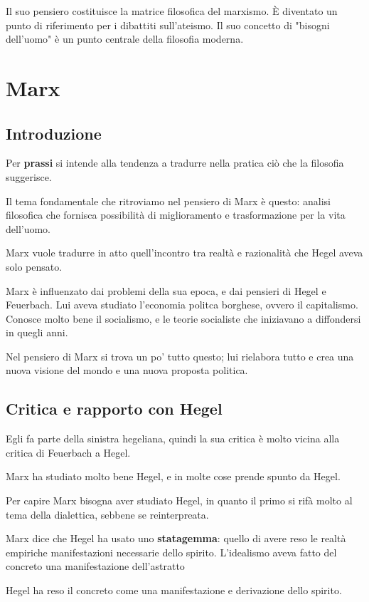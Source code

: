 \documentclass[a4paper, twoside, titlepage]{book}
\begin{document}
Il suo pensiero costituisce la matrice filosofica del marxismo. È diventato un punto di riferimento per i dibattiti sull'ateismo. Il suo concetto di "bisogni dell'uomo" è un punto centrale della filosofia moderna.


\part{Marx}

\chapter*{Introduzione}

Per \textbf{prassi} si intende alla tendenza a tradurre nella pratica ciò che la filosofia suggerisce.

Il tema fondamentale che ritroviamo nel pensiero di Marx è questo: analisi filosofica che fornisca possibilità di miglioramento e trasformazione per la vita dell'uomo.

Marx vuole tradurre in atto quell'incontro tra realtà e razionalità che Hegel aveva solo pensato.

Marx è influenzato dai problemi della sua epoca, e dai pensieri di Hegel e Feuerbach.
Lui aveva studiato l'economia politca borghese, ovvero il capitalismo.
Conosce molto bene il socialismo, e le teorie socialiste che iniziavano a diffondersi in quegli anni.

Nel pensiero di Marx si trova un po' tutto questo; lui rielabora tutto e crea una nuova visione del mondo e una nuova proposta politica.

\chapter{Critica e rapporto con Hegel}

Egli fa parte della sinistra hegeliana, quindi la sua critica è molto vicina alla critica di Feuerbach a Hegel.

Marx ha studiato molto bene Hegel, e in molte cose prende spunto da Hegel.

Per capire Marx bisogna aver studiato Hegel, in quanto il primo si rifà molto al tema della dialettica, sebbene se reinterpreata.

Marx dice che Hegel ha usato uno \textbf{statagemma}: quello di avere reso le realtà empiriche manifestazioni necessarie dello spirito. L'idealismo aveva fatto del concreto una manifestazione dell'astratto

Hegel ha reso il concreto come una manifestazione e derivazione dello spirito.
\end{document}
